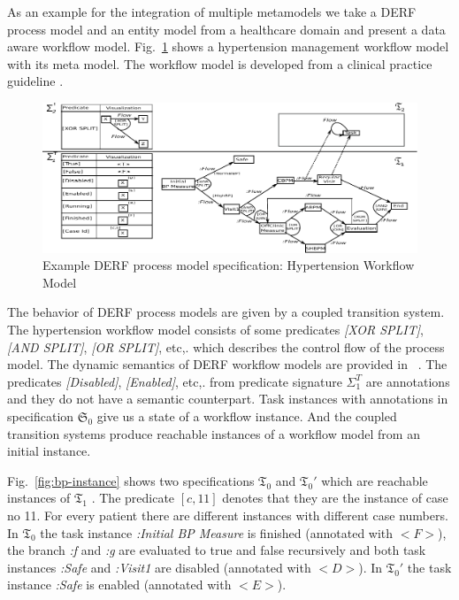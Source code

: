 \documentclass{eceasst}
\begin{document}
As an example for the integration of multiple metamodels we take a DERF process model and an entity model from a healthcare domain and present a data aware workflow model.
Fig.~\ref{fig:bp} shows a hypertension management workflow model with its meta model. The workflow model is developed from a clinical practice guideline \cite{HTN}. 


\begin{figure}[h]
\centering
 \includegraphics[width=\textwidth]{bp.pdf}
 \caption{Example DERF process model specification: Hypertension Workflow Model}
 \label{fig:bp}
 \end{figure}
 
The behavior of DERF process models are given by a coupled transition system. 
The hypertension workflow model consists of some predicates \textit{[XOR SPLIT]}, \textit{[AND SPLIT]}, \textit{[OR SPLIT]}, etc,. which describes the control flow of the process model. 
The dynamic semantics of DERF workflow models are provided in ~\cite{RutleMacCaullEtAl2012ECMFA}. 
The predicates \textit{[Disabled]}, \textit{[Enabled]}, etc,. from predicate signature $\Sigma_1^T$ are annotations and they do not have a semantic counterpart. 
Task instances with annotations in specification $\mathfrak{S}_0$ give us a state of a workflow instance. 
And the coupled transition systems produce reachable instances of a workflow model from an initial instance. 


Fig.~\ref{fig:bp-instance} shows two specifications $\mathfrak{T}_0$ and $\mathfrak{T}_0'$ which are reachable instances of $\mathfrak{T}_1$ . 
The predicate $[c,11]$ denotes that they are the instance of case no 11. For every patient there are different instances with different case numbers. 
In $\mathfrak{T}_0$ the task instance \textit{:Initial BP Measure} is finished (annotated with $<F>$), the branch \textit{:f} and \textit{:g} are evaluated to true and false recursively and both task instances 
\textit{:Safe} and \textit{:Visit1} are disabled (annotated with $<D>$). 
In $\mathfrak{T}_0′$ the task instance \textit{:Safe} is enabled (annotated with $<E>$).
\end{document}
